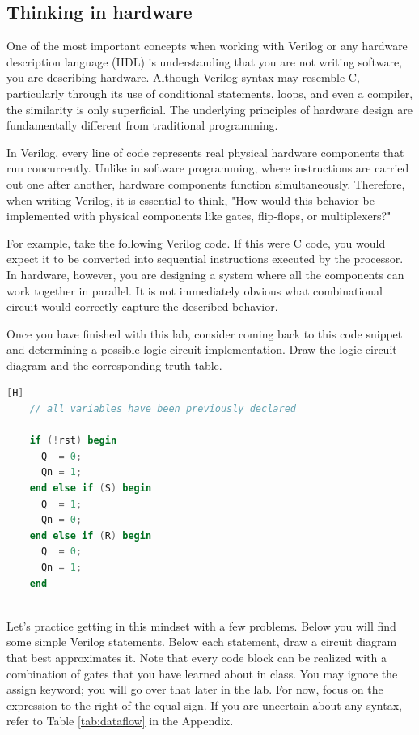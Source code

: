 \documentclass[12pt]{journal}
\begin{document}
\subsection{Thinking in hardware}
One of the most important concepts when working with Verilog or any hardware description language (HDL) is understanding that you are not writing software, you are describing hardware. Although Verilog syntax may resemble C, particularly through its use of conditional statements, loops, and even a compiler, the similarity is only superficial. The underlying principles of hardware design are fundamentally different from traditional programming.

In Verilog, every line of code represents real physical hardware components that run concurrently. Unlike in software programming, where instructions are carried out one after another, hardware components function simultaneously. Therefore, when writing Verilog, it is essential to think, "How would this behavior be implemented with physical components like gates, flip-flops, or multiplexers?"

For example, take the following Verilog code. If this were C code, you would expect it to be converted into sequential instructions executed by the processor. In hardware, however, you are designing a system where all the components can work together in parallel. It is not immediately obvious what combinational circuit would correctly capture the described behavior.

\begin{bonusquestion}
Once you have finished with this lab, consider coming back to this code snippet and determining a possible logic circuit implementation. Draw the logic circuit diagram and the corresponding truth table.
\end{bonusquestion}

\begin{lstlisting}[language=Verilog][H]
    // all variables have been previously declared
    
    if (!rst) begin
      Q  = 0;
      Qn = 1;
    end else if (S) begin
      Q  = 1;
      Qn = 0;
    end else if (R) begin
      Q  = 0;
      Qn = 1;
    end
    
\end{lstlisting}
\clearpage
\begin{question}[Practice]
    Let's practice getting in this mindset with a few problems. Below you will find some simple Verilog statements. Below each statement, draw a circuit diagram that best approximates it. Note that every code block can be realized with a combination of gates that you have learned about in class. You may ignore the assign keyword; you will go over that later in the lab. For now, focus on the expression to the right of the equal sign. If you are uncertain about any syntax, refer to Table \ref{tab:dataflow} in the Appendix.
\end{question}
\end{document}
